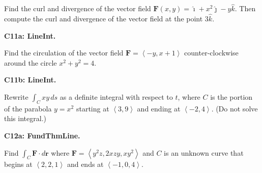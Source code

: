\documentclass[12pt]{article}
\newcommand{\vect}{\mathbf}
\newcommand{\<}{\left\langle}
\renewcommand{\>}{\right\rangle}
\newcommand{\veci}{\hat{\imath}}
\newcommand{\vecj}{\hat{\jmath}}
\newcommand{\veck}{\hat{k}}
\newcommand{\exerciseHeader}[4]{


  \vspace{0.5em}
  \textbf{#2}
  \vspace{0.5em}

}
\begin{document}
\begin{multicols}{2}
Find the curl and divergence of the vector field
\(\vect F(x,y)=\veci+x^2\vecj-y\veck\). Then compute the curl and divergence
of the vector field at the point \(3\veck\).



\exerciseHeader{2017 July 18}{C11a: LineInt.}{
Compute and apply line integrals.
}{1/4}

Find the circulation of the vector field \(\vect F=\<-y,x+1\>\)
counter-clockwise around the circle \(x^2+y^2=4\).

\exerciseHeader{2017 July 19}{C11b: LineInt.}{
Compute and apply line integrals.
}{2/4}

Rewrite \(\int_C xy\,ds\) as a definite integral with respect to \(t\),
where \(C\) is the portion of the parabola \(y=x^2\) starting at \(\<3,9\>\)
and ending at \(\<-2,4\>\).
(Do not solve this integral.)

%

%

%



\exerciseHeader{2017 July 19}{C12a: FundThmLine.}{
Apply the Fundamental Theorem of Line Integrals.
}{1/4}

Find \(\int_C\vect F\cdot d\vect r\) where \(\vect F=\<y^2z,2xzy,xy^2\>\)
and \(C\) is an unknown curve that begins at \(\<2,2,1\>\) and ends at
\(\<-1,0,4\>\).

%


\end{multicols}
\end{document}
